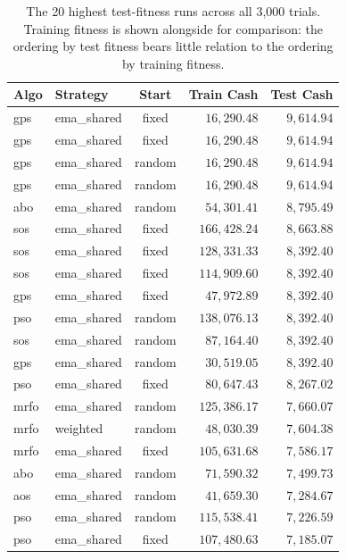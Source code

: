 \begin{table}[ht]
\centering
\caption{\label{tab:algo_run_details}%
The 20 highest test-fitness runs across all 3{,}000 trials. Training fitness
is shown alongside for comparison: the ordering by test fitness bears little
relation to the ordering by training fitness.}
\small
\begin{tabular}{llcrr}
\toprule
\textbf{Algo} & \textbf{Strategy} & \textbf{Start} & \textbf{Train Cash} & \textbf{Test Cash} \\
\midrule
gps  & ema\_shared & fixed  & $16{,}290.48$  & $9{,}614.94$ \\
gps  & ema\_shared & fixed  & $16{,}290.48$  & $9{,}614.94$ \\
gps  & ema\_shared & random & $16{,}290.48$  & $9{,}614.94$ \\
gps  & ema\_shared & random & $16{,}290.48$  & $9{,}614.94$ \\
abo  & ema\_shared & random & $54{,}301.41$  & $8{,}795.49$ \\
sos  & ema\_shared & fixed  & $166{,}428.24$ & $8{,}663.88$ \\
sos  & ema\_shared & fixed  & $128{,}331.33$ & $8{,}392.40$ \\
sos  & ema\_shared & fixed  & $114{,}909.60$ & $8{,}392.40$ \\
gps  & ema\_shared & fixed  & $47{,}972.89$  & $8{,}392.40$ \\
pso  & ema\_shared & random & $138{,}076.13$ & $8{,}392.40$ \\
sos  & ema\_shared & random & $87{,}164.40$  & $8{,}392.40$ \\
gps  & ema\_shared & random & $30{,}519.05$  & $8{,}392.40$ \\
pso  & ema\_shared & fixed  & $80{,}647.43$  & $8{,}267.02$ \\
mrfo & ema\_shared & random & $125{,}386.17$ & $7{,}660.07$ \\
mrfo & weighted    & random & $48{,}030.39$  & $7{,}604.38$ \\
mrfo & ema\_shared & fixed  & $105{,}631.68$ & $7{,}586.17$ \\
abo  & ema\_shared & random & $71{,}590.32$  & $7{,}499.73$ \\
aos  & ema\_shared & random & $41{,}659.30$  & $7{,}284.67$ \\
pso  & ema\_shared & random & $115{,}538.41$ & $7{,}226.59$ \\
pso  & ema\_shared & fixed  & $107{,}480.63$ & $7{,}185.07$ \\
\bottomrule
\end{tabular}
\end{table}
